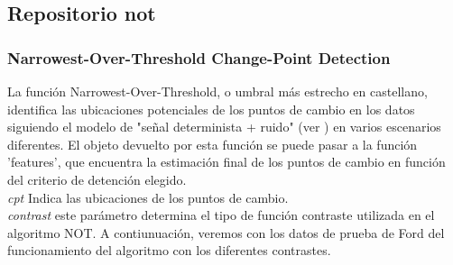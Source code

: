 \documentclass[runningheads,a4paper,12pt]{report}
\begin{document}
\subsection{Repositorio not \cite{not}}
\subsubsection{Narrowest-Over-Threshold Change-Point Detection}
La función Narrowest-Over-Threshold, o umbral más estrecho en castellano, identifica las ubicaciones potenciales de los puntos de cambio en los datos siguiendo el modelo de "señal determinista + ruido" (ver \cite{not}) en varios escenarios diferentes. El objeto devuelto por esta función se puede pasar a la función 'features', que encuentra la estimación final de los puntos de cambio en función del criterio de detención elegido.\\

\textit{cpt} Indica las ubicaciones de los puntos de cambio.\\
 
\textit{contrast} este parámetro determina el tipo de función contraste utilizada en el algoritmo NOT. A contiunuación, veremos con los datos de prueba de Ford del funcionamiento del algoritmo con los diferentes contrastes. 
\end{document}
